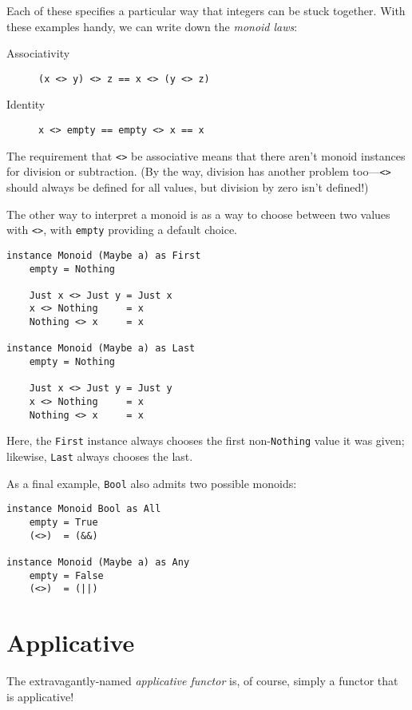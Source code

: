 \documentclass{book}
\newcommand{\mlil}[1]{\lstinline[language=pseudoml,columns=fixed]|#1|}\usepackage{caption}
\begin{document}
Each of these specifies a particular way that integers can be stuck together. With these examples handy, we can write down the \emph{monoid laws}:

\begin{description}
    \item[Associativity] \mlil{(x <> y) <> z == x <> (y <> z)}
    \item[Identity] \mlil{x <> empty == empty <> x == x}
\end{description}

The requirement that \mlil{<>} be associative means that there aren't monoid instances for division or subtraction. (By the way, division has another problem too---\mlil{<>} should always be defined for all values, but division by zero isn't defined!)

The other way to interpret a monoid is as a way to choose between two values with \mlil{<>}, with \mlil{empty} providing a default choice.

\begin{lstlisting}[language=pseudoml]
instance Monoid (Maybe a) as First
    empty = Nothing
    
    Just x <> Just y = Just x
    x <> Nothing     = x
    Nothing <> x     = x

instance Monoid (Maybe a) as Last
    empty = Nothing
    
    Just x <> Just y = Just y
    x <> Nothing     = x
    Nothing <> x     = x
\end{lstlisting}

Here, the \mlil{First} instance always chooses the first non-\mlil{Nothing} value it was given; likewise, \mlil{Last} always chooses the last.

As a final example, \mlil{Bool} also admits two possible monoids:

\begin{lstlisting}[language=pseudoml]
instance Monoid Bool as All
    empty = True
    (<>)  = (&&)

instance Monoid (Maybe a) as Any
    empty = False
    (<>)  = (||)
\end{lstlisting}

\section{Applicative}

The extravagantly-named \emph{applicative functor} is, of course, simply a functor that is applicative!
\end{document}
